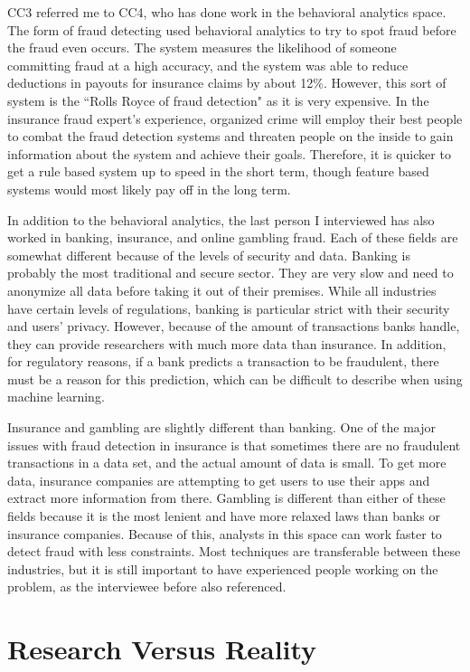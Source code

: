 \documentclass[midd]{thesis}
\begin{document}
CC3 referred me to CC4, who has done work in the behavioral analytics space. The form of fraud detecting used behavioral analytics to try to spot fraud before the fraud even occurs. The system measures the likelihood of someone committing fraud at a high accuracy, and the system was able to reduce deductions in payouts for insurance claims by about 12\%. However, this sort of system is the ``Rolls Royce of fraud detection" as it is very expensive. In the insurance fraud expert's experience, organized crime will employ their best people to combat the fraud detection systems and threaten people on the inside to gain information about the system and achieve their goals. Therefore, it is quicker to get a rule based system up to speed in the short term, though feature based systems would most likely pay off in the long term.

In addition to the behavioral analytics, the last person I interviewed has also worked in banking, insurance, and online gambling fraud. Each of these fields are somewhat different because of the levels of security and data. Banking is probably the most traditional and secure sector. They are very slow and need to anonymize all data before taking it out of their premises. While all industries have certain levels of regulations, banking is particular strict with their security and users' privacy. However, because of the amount of transactions banks handle, they can provide researchers with much more data than insurance. In addition, for regulatory reasons, if a bank predicts a transaction to be fraudulent, there must be a reason for this prediction, which can be difficult to describe when using machine learning. 

Insurance and gambling are slightly different than banking. One of the major issues with fraud detection in insurance is that sometimes there are no fraudulent transactions in a data set, and the actual amount of data is small. To get more data, insurance companies are attempting to get users to use their apps and extract more information from there. Gambling is different than either of these fields because it is the most lenient and have more relaxed laws than banks or insurance companies. Because of this, analysts in this space can work faster to detect fraud with less constraints. Most techniques are transferable between these industries, but it is still important to have experienced people working on the problem, as the interviewee before also referenced. 


\section{ Research Versus Reality}
\end{document}
